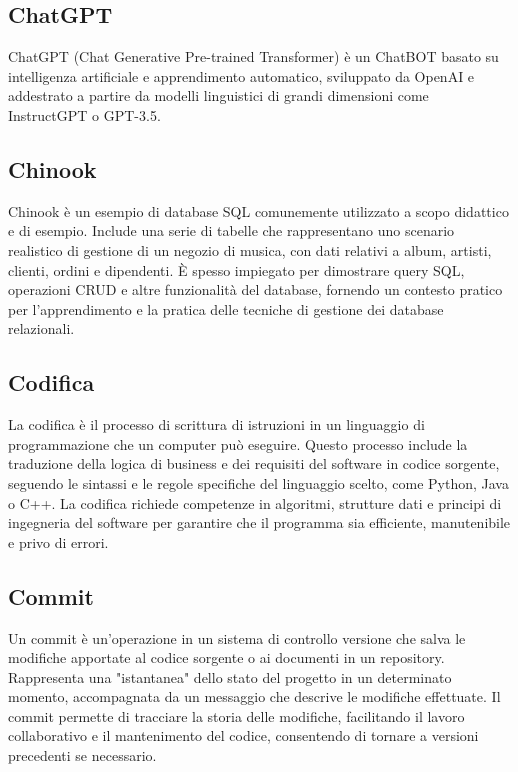 \vspace{2em}
\subsection*{ChatGPT}
\par ChatGPT (Chat Generative Pre-trained Transformer) è un ChatBOT basato su intelligenza artificiale e apprendimento automatico, sviluppato da OpenAI e addestrato a partire da modelli linguistici di grandi dimensioni come InstructGPT o GPT-3.5.

\vspace{2em}
\subsection*{Chinook}
\par Chinook è un esempio di database SQL comunemente utilizzato a scopo didattico e di esempio. Include una serie di tabelle che rappresentano uno scenario realistico di gestione di un negozio di musica, con dati relativi a album, artisti, clienti, ordini e dipendenti. È spesso impiegato per dimostrare query SQL, operazioni CRUD e altre funzionalità del database, fornendo un contesto pratico per l'apprendimento e la pratica delle tecniche di gestione dei database relazionali.

\vspace{2em}
\subsection*{Codifica}
\par La codifica è il processo di scrittura di istruzioni in un linguaggio di programmazione che un computer può eseguire. Questo processo include la traduzione della logica di business e dei requisiti del software in codice sorgente, seguendo le sintassi e le regole specifiche del linguaggio scelto, come Python, Java o C++. La codifica richiede competenze in algoritmi, strutture dati e principi di ingegneria del software per garantire che il programma sia efficiente, manutenibile e privo di errori.

\vspace{2em}
\subsection*{Commit}
\par Un commit è un'operazione in un sistema di controllo versione che salva le modifiche apportate al codice sorgente o ai documenti in un repository. Rappresenta una "istantanea" dello stato del progetto in un determinato momento, accompagnata da un messaggio che descrive le modifiche effettuate. Il commit permette di tracciare la storia delle modifiche, facilitando il lavoro collaborativo e il mantenimento del codice, consentendo di tornare a versioni precedenti se necessario.


